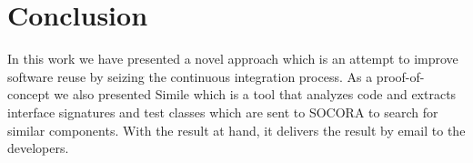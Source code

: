\chapter{Conclusion}
In this work we have presented a novel approach which is an attempt to improve software reuse by seizing the continuous integration process. As a proof-of-concept we also presented Simile which is a tool that analyzes code and extracts interface signatures and test classes which are sent to SOCORA to search for similar components. With the result at hand, it delivers the result by email to the developers.